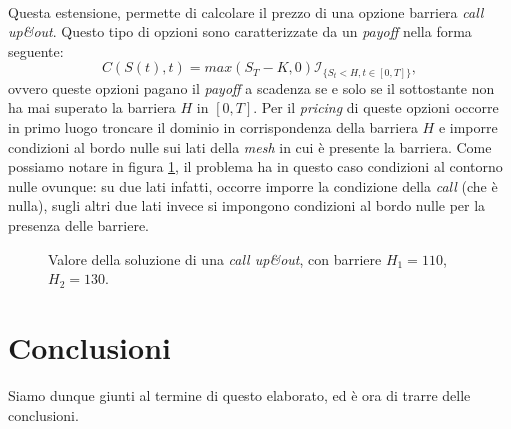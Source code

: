 \documentclass[a4paper,10pt]{report}
\theoremstyle{plain}
\theoremstyle{definition}
\theoremstyle{remark}
\begin{document}
\begin{description}[leftmargin=0cm]
 \item[\bf barrier]  \hfill \\ Questa estensione, permette di calcolare il prezzo di una opzione barriera \emph{call up\&out}. Questo tipo di opzioni sono caratterizzate da un \emph{payoff} nella forma seguente: $$C(S(t),t)=max(S_T-K,0)\mathcal{I}_{\{S_t<H, t\in[0,T]\}},$$ ovvero queste opzioni pagano il \emph{payoff} a scadenza se e solo se il sottostante non ha mai superato la barriera $H$ in $[0,T]$. Per il \emph{pricing} di queste opzioni occorre in primo luogo troncare il dominio in corrispondenza della barriera $H$ e imporre condizioni al bordo nulle sui lati della \emph{mesh} in cui \`e presente la barriera. Come possiamo notare in figura \ref{fig:barrier}, il problema ha in questo caso condizioni al contorno nulle ovunque: su due lati infatti, occorre imporre la condizione della \emph{call} (che \`e nulla), sugli altri due lati invece si impongono condizioni al bordo nulle per la presenza delle barriere.
 \begin{figure}[htp!]
\begin{center}
\caption{Valore della soluzione di una \emph{call up\&out}, con barriere $H_1=110$, $H_2=130$.}
\label{fig:barrier}
\end{center}
\end{figure}
\end{description}


\chapter{Conclusioni}
Siamo dunque giunti al termine di questo elaborato, ed \`e ora di trarre delle conclusioni.\\
\end{document}
